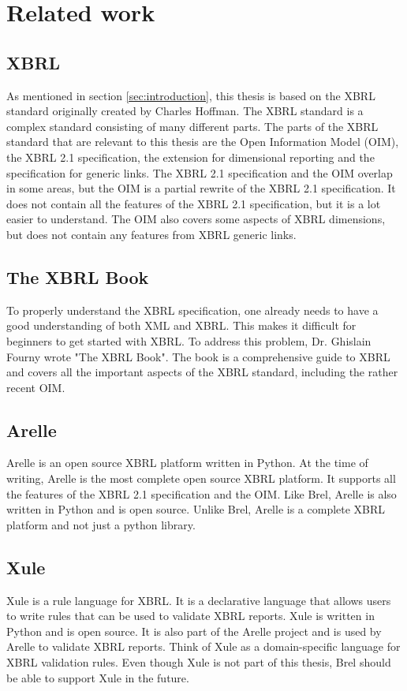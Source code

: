 \chapter{Related work}
\label{sec:related_work}

\section{XBRL}
As mentioned in section \ref{sec:introduction}, this thesis is based on the XBRL standard\cite{xbrl} originally created by Charles Hoffman.
The XBRL standard is a complex standard consisting of many different parts.
The parts of the XBRL standard that are relevant to this thesis are the Open Information Model (OIM)\cite{oim}, 
the XBRL 2.1 specification\cite{xbrl21}, 
the extension for dimensional reporting\cite{xbrl_dimensions}
and the specification for generic links\cite{xbrl_generic_links}.
The XBRL 2.1 specification and the OIM overlap in some areas, but the OIM is a partial rewrite of the XBRL 2.1 specification.
It does not contain all the features of the XBRL 2.1 specification, but it is a lot easier to understand.
The OIM also covers some aspects of XBRL dimensions, but does not contain any features from XBRL generic links.

\section{The XBRL Book}
To properly understand the XBRL specification, one already needs to have a good understanding of both XML and XBRL.
This makes it difficult for beginners to get started with XBRL.
To address this problem, Dr. Ghislain Fourny wrote "The XBRL Book"\cite{fourny2023xbrl}.
The book is a comprehensive guide to XBRL and covers all the important aspects of the XBRL standard, including the rather recent OIM.

\section{Arelle}
Arelle\cite{arelle} is an open source XBRL platform written in Python.
At the time of writing, Arelle is the most complete open source XBRL platform.
It supports all the features of the XBRL 2.1 specification and the OIM.
Like Brel, Arelle is also written in Python and is open source.
Unlike Brel, Arelle is a complete XBRL platform and not just a python library.

\section{Xule}
Xule\cite{xule} is a rule language for XBRL.
It is a declarative language that allows users to write rules that can be used to validate XBRL reports.
Xule is written in Python and is open source.
It is also part of the Arelle project and is used by Arelle to validate XBRL reports.
Think of Xule as a domain-specific language for XBRL validation rules.
Even though Xule is not part of this thesis, Brel should be able to support Xule in the future.
